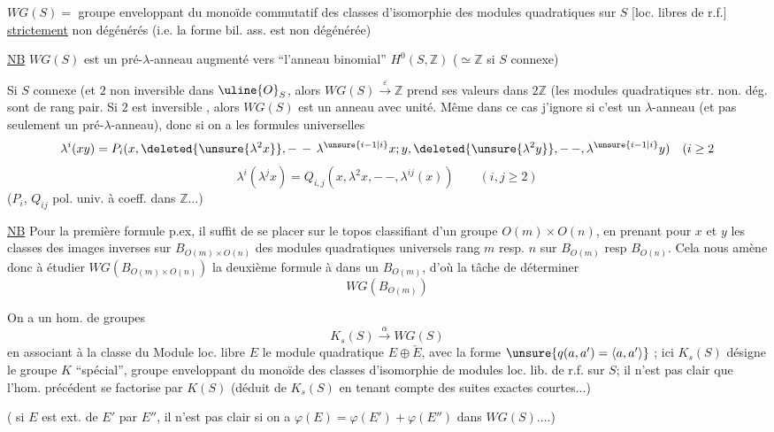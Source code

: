 $WG(S)=$ groupe enveloppant du monoïde commutatif
 des classes d'isomorphie des modules quadratiques
 sur $S$ [loc. libres de r.f.] \uline{strictement} non
 dégénérés (i.e. la forme bil. ass. est non
 dégénérée)

\uline{NB} $WG(S)$ est un pré-$\lambda$-anneau
 augmenté vers
``l'anneau binomial'' $H^0(S,\mathbb Z)$ ($\simeq\mathbb Z$ si $S$ connexe)

Si $S$ connexe  (et $2$ non inversible dans $\uline{O}_S$,
alors $WG(S)\xrightarrow{\varepsilon}\mathbb Z$ prend ses valeurs dans $2\mathbb Z$
(les modules quadratiques str. non. dég. sont de
rang pair. Si $2$ est inversible , alors
$WG(S)$ est un anneau avec unité. Même
dans ce cas j'ignore si c'est un $\lambda$-anneau
(et pas seulement un pré-$\lambda$-anneau), donc
si on a les formules universelles
\[
\lambda^i(xy)=P_i(x,\deleted{\unsure{\lambda^2x}},-\,-\,\lambda^{\unsure{i-1|i}}x;
 y,\deleted{\unsure{\lambda^2y}},-\,-,\lambda^{\unsure{i-1|i}}y)\quad(i\ge2
\]
\[
\lambda^i(\lambda^j x)=Q_{i,j}(x,\lambda^2x,-\,-,\lambda^{ij}(x))
\qquad(i,j\ge2)
\]
($P_i$, $Q_{ij}$ pol. univ. à coeff. dans $\mathbb Z$...)

\uline{NB} Pour la première formule p.ex, il suffit de se
placer sur le topos classifiant d'un
groupe $O(m)\times O(n)$, en prenant pour $x$ et $y$
les classes des images inverses sur $B_{O(m)\times O(n)}$
des  modules quadratiques universels
 rang $m$ resp. $n$ sur $B_{O(m)}$ resp $B_{O(n)}$.
Cela nous amène donc à étudier $WG(B_{O(m)\times O(n)})$
 la deuxième formule à  dans
un $B_{O(m)}$, d'où la tâche de déterminer
\[
WG(B_{O(m)})
\]

On a un hom. de groupes
\[
K_s(S)\xrightarrow{\alpha}WG(S)
\]
en associant à la classe du  Module loc. libre $E$ 
le  module quadratique $E\oplus\check E$, avec la forme
$\unsure{q(a,a')=\langle a,a'\rangle}$ ; ici $K_s(S)$ désigne le groupe $K$
``spécial'', groupe enveloppant du monoïde des
classes d'isomorphie de modules loc. lib. de r.f. sur $S$;
il n'est pas clair que l'hom. précédent se factorise
par $K(S)$ (déduit de $K_s(S)$ en tenant compte des
suites exactes courtes...)

( si $E$ est ext.  de $E'$ par $E''$, il n'est pas clair
si on a $\varphi(E)=\varphi(E')+\varphi(E'')$ dans $WG(S)$....)

